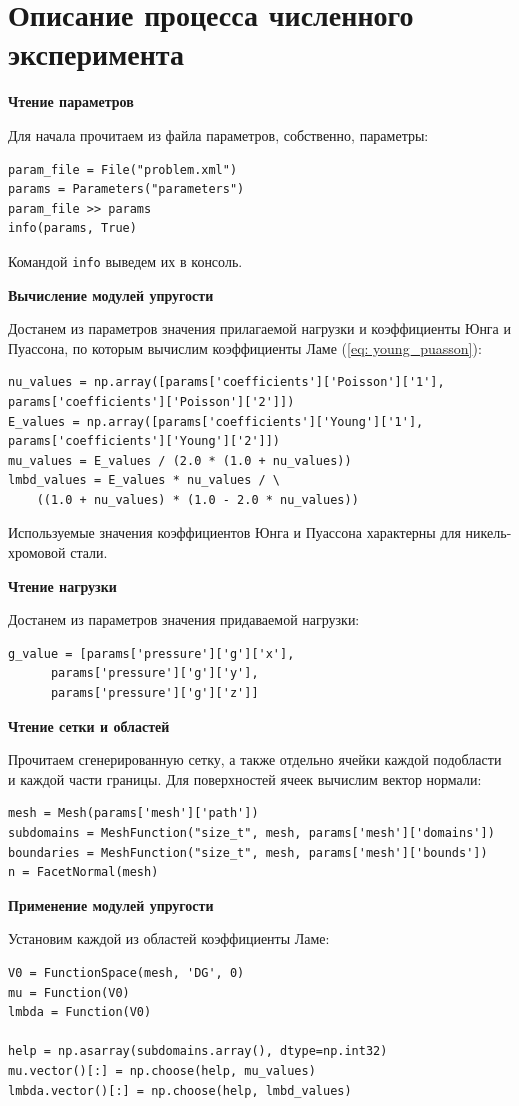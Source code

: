 \documentclass[a4paper, 14pt]{extreport}
\begin{document}
\section{Описание процесса численного эксперимента}

\textbf{Чтение параметров}

Для начала прочитаем из файла параметров, собственно, параметры:
\begin{lstlisting}
param_file = File("problem.xml")
params = Parameters("parameters")
param_file >> params
info(params, True)
\end{lstlisting}

Командой \texttt{info} выведем их в консоль. 

\textbf{Вычисление модулей упругости}

Достанем из параметров значения прилагаемой нагрузки и
коэффициенты Юнга и Пуассона, по которым вычислим коэффициенты Ламе (\ref{eq: young_puasson}):
\begin{lstlisting}
nu_values = np.array([params['coefficients']['Poisson']['1'],
params['coefficients']['Poisson']['2']])
E_values = np.array([params['coefficients']['Young']['1'],
params['coefficients']['Young']['2']])
mu_values = E_values / (2.0 * (1.0 + nu_values))
lmbd_values = E_values * nu_values / \
    ((1.0 + nu_values) * (1.0 - 2.0 * nu_values))
\end{lstlisting}
Используемые значения коэффициентов Юнга и Пуассона характерны для никель-хромовой стали.

\textbf{Чтение нагрузки}

Достанем из параметров значения придаваемой нагрузки:
\begin{lstlisting}
g_value = [params['pressure']['g']['x'], 
      params['pressure']['g']['y'],
      params['pressure']['g']['z']]
\end{lstlisting}

\textbf{Чтение сетки и областей}

Прочитаем сгенерированную сетку, а также отдельно ячейки каждой подобласти и каждой части границы. Для поверхностей ячеек вычислим вектор нормали:
\begin{lstlisting}
mesh = Mesh(params['mesh']['path'])
subdomains = MeshFunction("size_t", mesh, params['mesh']['domains'])
boundaries = MeshFunction("size_t", mesh, params['mesh']['bounds'])
n = FacetNormal(mesh)
\end{lstlisting}

\textbf{Применение модулей упругости}

Установим каждой из областей коэффициенты Ламе:
\begin{lstlisting}
V0 = FunctionSpace(mesh, 'DG', 0)
mu = Function(V0)
lmbda = Function(V0)

help = np.asarray(subdomains.array(), dtype=np.int32)
mu.vector()[:] = np.choose(help, mu_values)
lmbda.vector()[:] = np.choose(help, lmbd_values)
\end{lstlisting}
\end{document}
